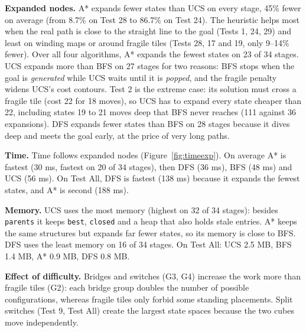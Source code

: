 \textbf{Expanded nodes.} A* expands fewer states than UCS on every stage, 45\% fewer on average
(from 8.7\% on Test 28 to 86.7\% on Test 24). The heuristic helps most when the real path is close
to the straight line to the goal (Tests 1, 24, 29) and least on winding maps or around fragile tiles
(Tests 28, 17 and 19, only 9--14\% fewer). Over all four algorithms, A* expands the fewest states on 23 of
34 stages. UCS expands more than BFS on 27 stages for two reasons: BFS stops when the goal is
\emph{generated} while UCS waits until it is \emph{popped}, and the fragile penalty widens UCS's cost
contours. Test 2 is the extreme case: its solution must cross a fragile tile (cost 22 for 18 moves),
so UCS has to expand every state cheaper than 22, including states 19 to 21 moves deep that BFS never
reaches (111 against 36 expansions). DFS expands fewer states than BFS on 28 stages because it dives
deep and meets the goal early, at the price of very long paths.

\textbf{Time.} Time follows expanded nodes (Figure~\ref{fig:timeexp}). On average A* is fastest
(30 ms, fastest on 20 of 34 stages), then DFS (36 ms), BFS (48 ms) and UCS (56 ms). On Test All, DFS
is fastest (138 ms) because it expands the fewest states, and A* is second (188 ms).

\textbf{Memory.} UCS uses the most memory (highest on 32 of 34 stages): besides \texttt{parents} it
keeps \texttt{best}, \texttt{closed} and a heap that also holds stale entries. A* keeps the same
structures but expands far fewer states, so its memory is close to BFS. DFS uses the least memory on
16 of 34 stages. On Test All: UCS 2.5 MB, BFS 1.4 MB, A* 0.9 MB, DFS 0.8 MB.

\textbf{Effect of difficulty.} Bridges and switches (G3, G4) increase the work more than fragile
tiles (G2): each bridge group doubles the number of possible configurations, whereas fragile tiles
only forbid some standing placements. Split switches (Test 9, Test All) create the largest state
spaces because the two cubes move independently.

